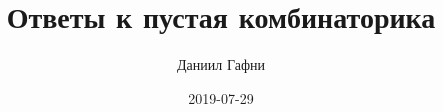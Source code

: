 \documentclass{article}%
\title{Ответы к пустая комбинаторика}%
\author{Даниил Гафни}%
\date{2019{-}07{-}29}%
\begin{document}
%
\normalsize%
\maketitle%
\end{document}

